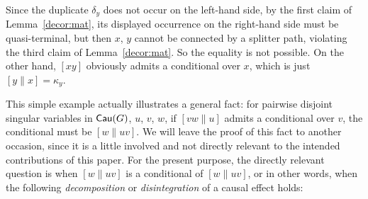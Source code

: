 \documentclass[12pt]{amsart}
\theoremstyle{plain}
\theoremstyle{definition}
\theoremstyle{remark}
\numberwithin{equation}{section}
\theoremstyle{plain}
\newcommand{\0}{\emptyset}
\DeclareMathOperator{\cau}{\sf{Cau}}
\newcommand{\memph}[1]{{\color{magenta}\emph{#1}}}
\begin{document}
Since the duplicate $\delta_y$ does not occur on the left-hand side, by the first claim of Lemma~\ref{decor:mat}, its displayed occurrence on the right-hand side must be quasi-terminal,  but then $x$, $y$ cannot  be connected by a splitter path, violating the third claim of Lemma~\ref{decor:mat}. So the equality is not possible. On the other hand, $[xy]$ obviously admits a conditional over $x$, which is just $[y\| x] = \kappa_y$.

This simple example actually illustrates a general fact: for pairwise disjoint singular variables in $\cau(G)$, $u$, $v$,  $w$, if $[vw \| u]$ admits a conditional over $v$,  the conditional must be $[w \| uv]$.  We will leave the proof of this fact to another occasion, since it is a little involved and not directly relevant to the intended contributions of this paper.  For the present purpose, the directly relevant question is when $[w \| uv]$ is a conditional of $[w \| uv]$, or in other words, when the following \memph{decomposition} or \memph{disintegration} of a causal effect holds:
\end{document}
